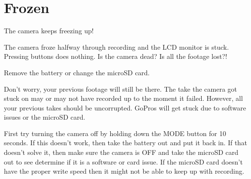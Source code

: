 \section{Frozen}
\pagecolor{white}
\label{chap:18}
\begin{fullwidth}

\problem

{\large The camera keeps freezing up! \par}

The camera froze halfway through recording and the LCD monitor is stuck. Pressing buttons does nothing. Is the camera dead? Is all the footage lost?! 


\solution

{\large Remove the battery or change the microSD card. \par}

Don’t worry, your previous footage will still be there. The take the camera got stuck on may or may not have recorded up to the moment it failed. However, all your previous takes should be uncorrupted. GoPros will get stuck due to software issues or the microSD card. 

First try turning the camera off by holding down the MODE button for 10 seconds. 
If this doesn’t work, then take the battery out and put it back in. If that doesn't solve it, then make sure the camera is OFF and take the microSD card out to see determine if it is a software or card issue. If the microSD card doesn't have the proper write speed then it might not be able to keep up with recording. 






\clearpage
\end{fullwidth}
